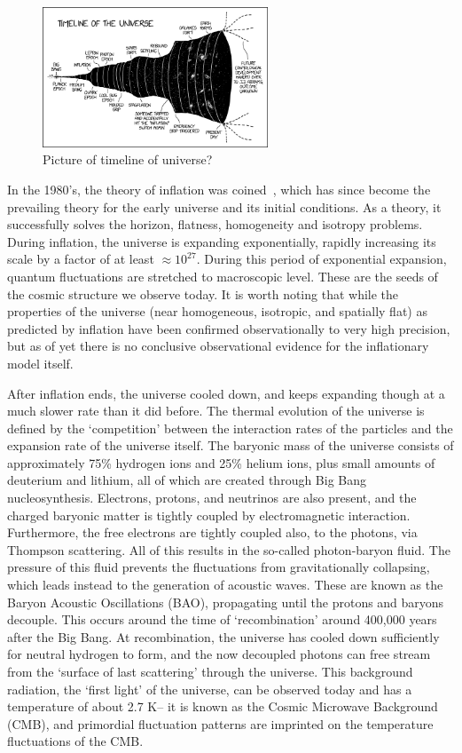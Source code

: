 \begin{figure}[ht]
	\centering
	\includegraphics[width=0.6\textwidth]{fig/timeline_of_the_universe.png}
	\caption{Picture of timeline of universe?}
	\label{fig:timelineuniverse}
\end{figure}
In the 1980's, the theory of inflation was coined~\cite{Guth:1980zm,Linde:1981mu,Albrecht:1982wi}, which has since become the prevailing theory for the early universe and its initial conditions. As a theory, it successfully solves the horizon, flatness, homogeneity and isotropy problems. During inflation, the universe is expanding exponentially, rapidly increasing its scale by a factor of at least $\approx 10^{27}$. During this period of exponential expansion, quantum fluctuations are stretched to macroscopic level. These are the seeds of the cosmic structure we observe today. It is worth noting that while the properties of the universe (near homogeneous, isotropic, and spatially flat) as predicted by inflation have been confirmed observationally to very high precision, but as of yet there is no conclusive observational evidence for the inflationary model itself. 

After inflation ends, the universe cooled down, and keeps expanding though at a much slower rate than it did before. The thermal evolution of the universe is defined by the `competition' between the interaction rates of the particles and the expansion rate of the universe itself. The baryonic mass of the universe consists of approximately 75\% hydrogen ions and 25\% helium ions, plus small amounts of deuterium and lithium, all of which are created through Big Bang nucleosynthesis. Electrons, protons, and neutrinos are also present, and the charged baryonic matter is tightly coupled by electromagnetic interaction. Furthermore, the free electrons are tightly coupled also, to the photons, via Thompson scattering. All of this results in the so-called photon-baryon fluid. The pressure of this fluid prevents the fluctuations from gravitationally collapsing, which leads instead to the generation of acoustic waves. These are known as the Baryon Acoustic Oscillations (BAO), propagating until the protons and baryons decouple. This occurs around the time of `recombination' around 400,000 years after the Big Bang. At recombination, the universe has cooled down sufficiently for neutral hydrogen to form, and the now decoupled photons can free stream from the `surface of last scattering' through the universe. This background radiation, the `first light' of the universe, can be observed today and has a temperature of about 2.7 K-- it is known as the Cosmic Microwave Background (CMB), and primordial fluctuation patterns are imprinted on the temperature fluctuations of the CMB. 

